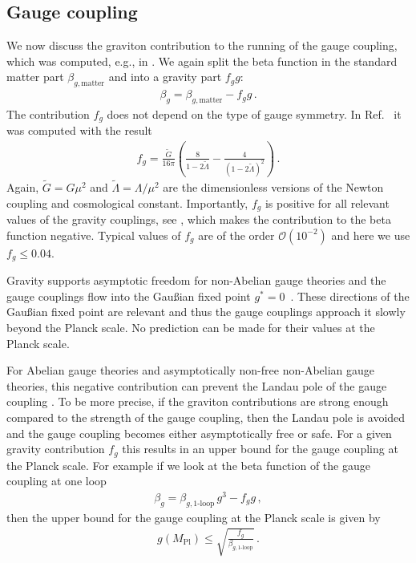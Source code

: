 \documentclass[aps,prd,twocolumn,preprintnumbers,superscriptaddress,nobibnotes,floatfix,longbibliography]{revtex4-1}
\begin{document}
\subsection{Gauge coupling}
\label{sec:gauge}
We now discuss the graviton contribution to the running of the gauge coupling,
which was computed, e.g., in \cite{Daum:2009dn,1101.6007,Folkerts:2011jz,1702.07724,Christiansen:2017cxa,1709.07252}.
We again split the beta function in the standard matter part $\beta_{g,\text{matter}}$ and into a gravity part $f_g g$:
\begin{align}
 \label{eq:beta-g}
 \beta_g = \beta_{g,\text{matter}} - f_g g \,.
\end{align}
The contribution $f_g$ does not depend on the type of gauge symmetry.
In Ref.~\cite{Christiansen:2017cxa} it was computed with the result 
\begin{align}
\label{eq:fg}
f_g  = \frac{\tilde G}{16\pi}\left( \frac{8}{1-2 \tilde \Lambda} - \frac{4}{(1-2 \tilde \Lambda)^2} \right) \,.
\end{align}
Again, $\tilde G=G \mu^2$ and $\tilde \Lambda =\Lambda/\mu^2$ are the dimensionless versions of the Newton coupling and cosmological constant.
Importantly, $f_g$ is positive for all relevant values of the gravity couplings, see \cite{Christiansen:2017cxa},
which makes the contribution to the beta function negative.
Typical values of $f_g$ are of the order $\mathcal{O}(10^{-2})$ \cite{Eichhorn:2018whv}
and here we use $f_g \leq 0.04$.

Gravity supports asymptotic freedom for non-Abelian gauge theories and the gauge couplings flow into the Gau\ss ian fixed point $g^*=0$~\cite{Folkerts:2011jz,Christiansen:2017cxa}.
These directions of the Gau\ss ian fixed point are relevant and thus the gauge couplings approach it slowly beyond the Planck scale. No prediction can be made for their values at the Planck scale.

For Abelian gauge theories and asymptotically non-free non-Abelian gauge theories, this negative contribution can prevent the Landau pole of the gauge coupling \cite{Daum:2009dn,1709.07252}.
To be more precise, if the graviton contributions are strong enough compared to the strength of the gauge coupling,
then the Landau pole is avoided and the gauge coupling becomes either asymptotically free or safe.
For a given gravity contribution $f_g$ this results in an upper bound for the gauge coupling at the Planck scale.
For example if we look at the beta function of the gauge coupling at one loop
\begin{align}
 \beta_g = \beta_{g,\text{1-loop}}\, g^3 - f_g g \,,
\end{align}
then the upper bound for the gauge coupling at the Planck scale is given by
\begin{align}
 \label{eq:prediction-g}
 g(M_\text{Pl}) \leq \sqrt{\frac{f_g}{\beta_{g,\text{1-loop}}}}\,.
\end{align}
\end{document}
